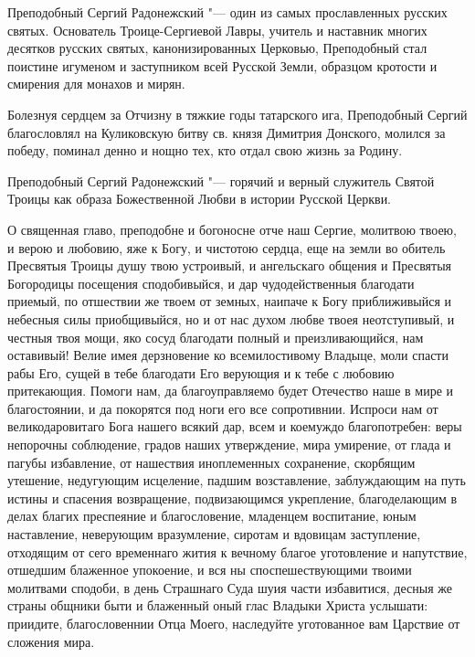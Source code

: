 
Преподобный Сергий Радонежский "--- один из самых прославленных русских святых. Основатель Троице-Сергиевой Лавры, учитель и наставник многих десятков русских святых, канонизированных Церковью, Преподобный стал поистине игуменом и заступником всей Русской Земли, образцом кротости и смирения для монахов и мирян.

Болезнуя сердцем за Отчизну в тяжкие годы татарского ига, Преподобный Сергий благословлял на Куликовскую битву св. князя Димитрия Донского, молился за победу, поминал денно и нощно тех, кто отдал свою жизнь за Родину.




Преподобный Сергий Радонежский "--- горячий и верный служитель Святой Троицы как образа Божественной Любви в истории Русской Церкви.




О священная главо, преподобне и богоносне отче наш Сергие, молитвою твоею, и верою и любовию, яже к Богу, и чистотою сердца, еще на земли во обитель Пресвятыя Троицы душу твою устроивый, и ангельскаго общения и Пресвятыя Богородицы посещения сподобивыйся, и дар чудодейственныя благодати приемый, по отшествии же твоем от земных, наипаче к Богу приближивыйся и небесныя силы приобщивыйся, но и от нас духом любве твоея неотступивый, и честныя твоя мощи, яко сосуд благодати полный и преизливающийся, нам оставивый! Велие имея дерзновение ко всемилостивому Владыце, моли спасти рабы Его, сущей в тебе благодати Его верующия и к тебе с любовию притекающия. Помоги нам, да благоуправляемо будет Отечество наше в мире и благостоянии, и да покорятся под ноги его все сопротивнии. Испроси нам от великодаровитаго Бога нашего всякий дар, всем и коемуждо благопотребен: веры непорочны соблюдение, градов наших утверждение, мира умирение, от глада и пагубы избавление, от нашествия иноплеменных сохранение, скорбящим утешение, недугующим исцеление, падшим возставление, заблуждающим на путь истины и спасения возвращение, подвизающимся укрепление, благоделающим в делах благих преспеяние и благословение, младенцем воспитание, юным наставление, неверующим вразумление, сиротам и вдовицам заступление, отходящим от сего временнаго жития к вечному благое уготовление и напутствие, отшедшим блаженное упокоение, и вся ны споспешествующими твоими молитвами сподоби, в день Страшнаго Суда шуия части избавитися, десныя же страны общники быти и блаженный оный глас Владыки Христа услышати: приидите, благословеннии Отца Моего, наследуйте уготованное вам Царствие от сложения мира.
\mychapterending

